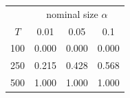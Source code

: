 % 
\begin{tabular}{cccc}
  \hline
  & \multicolumn{3}{c}{nominal size $\alpha$} \\
 $T$ & 0.01 & 0.05 & 0.1 \\
 \hline
100 & 0.000 & 0.000 & 0.000 \\ 
  250 & 0.215 & 0.428 & 0.568 \\ 
  500 & 1.000 & 1.000 & 1.000 \\ 
   \hline
\end{tabular}
